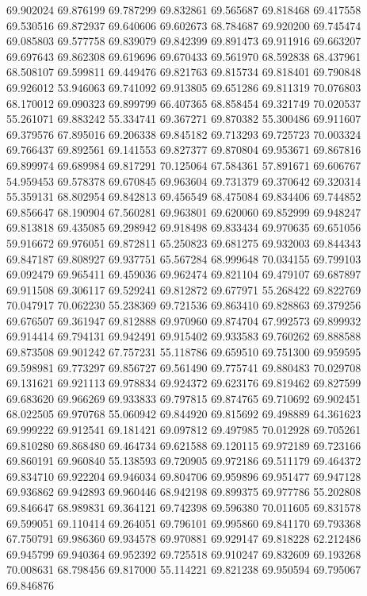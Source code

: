 69.902024
69.876199
69.787299
69.832861
69.565687
69.818468
69.417558
69.530516
69.872937
69.640606
69.602673
68.784687
69.920200
69.745474
69.085803
69.577758
69.839079
69.842399
69.891473
69.911916
69.663207
69.697643
69.862308
69.619696
69.670433
69.561970
68.592838
68.437961
68.508107
69.599811
69.449476
69.821763
69.815734
69.818401
69.790848
69.926012
53.946063
69.741092
69.913805
69.651286
69.811319
70.076803
68.170012
69.090323
69.899799
66.407365
68.858454
69.321749
70.020537
55.261071
69.883242
55.334741
69.367271
69.870382
55.300486
69.911607
69.379576
67.895016
69.206338
69.845182
69.713293
69.725723
70.003324
69.766437
69.892561
69.141553
69.827377
69.870804
69.953671
69.867816
69.899974
69.689984
69.817291
70.125064
67.584361
57.891671
69.606767
54.959453
69.578378
69.670845
69.963604
69.731379
69.370642
69.320314
55.359131
68.802954
69.842813
69.456549
68.475084
69.834406
69.744852
69.856647
68.190904
67.560281
69.963801
69.620060
69.852999
69.948247
69.813818
69.435085
69.298942
69.918498
69.833434
69.970635
69.651056
59.916672
69.976051
69.872811
65.250823
69.681275
69.932003
69.844343
69.847187
69.808927
69.937751
65.567284
68.999648
70.034155
69.799103
69.092479
69.965411
69.459036
69.962474
69.821104
69.479107
69.687897
69.911508
69.306117
69.529241
69.812872
69.677971
55.268422
69.822769
70.047917
70.062230
55.238369
69.721536
69.863410
69.828863
69.379256
69.676507
69.361947
69.812888
69.970960
69.874704
67.992573
69.899932
69.914414
69.794131
69.942491
69.915402
69.933583
69.760262
69.888588
69.873508
69.901242
67.757231
55.118786
69.659510
69.751300
69.959595
69.598981
69.773297
69.856727
69.561490
69.775741
69.880483
70.029708
69.131621
69.921113
69.978834
69.924372
69.623176
69.819462
69.827599
69.683620
69.966269
69.933833
69.797815
69.874765
69.710692
69.902451
68.022505
69.970768
55.060942
69.844920
69.815692
69.498889
64.361623
69.999222
69.912541
69.181421
69.097812
69.497985
70.012928
69.705261
69.810280
69.868480
69.464734
69.621588
69.120115
69.972189
69.723166
69.860191
69.960840
55.138593
69.720905
69.972186
69.511179
69.464372
69.834710
69.922204
69.946034
69.804706
69.959896
69.951477
69.947128
69.936862
69.942893
69.960446
68.942198
69.899375
69.977786
55.202808
69.846647
68.989831
69.364121
69.742398
69.596380
70.011605
69.831578
69.599051
69.110414
69.264051
69.796101
69.995860
69.841170
69.793368
67.750791
69.986360
69.934578
69.970881
69.929147
69.818228
62.212486
69.945799
69.940364
69.952392
69.725518
69.910247
69.832609
69.193268
70.008631
68.798456
69.817000
55.114221
69.821238
69.950594
69.795067
69.846876
